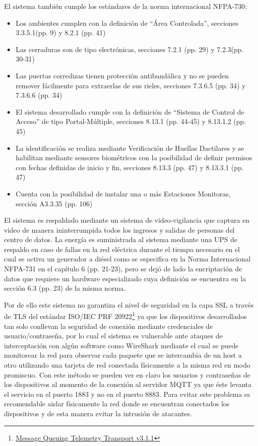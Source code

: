 \documentclass[../principal]{subfiles}
\begin{document}
  El sistema también cumple los estándares de la norma internacional NFPA-730\cite{norma:nfpa_730}:

  \begin{itemize}
    \item Los ambientes cumplen con la definición de ``Área Controlada'', secciones 3.3.5.1(pp. 9) y 8.2.1 (pp. 41)
    \item Las cerraduras son de tipo electrónicas, secciones 7.2.1 (pp. 29) y 7.2.3(pp. 30-31)
    \item Las puertas corredizas tienen protección antibandálica y no se pueden remover fácilmente para extraerlas de sus rieles, secciones 7.3.6.5 (pp. 34) y 7.3.6.6 (pp. 34)
    \item El sistema desarrollado cumple con la definición de ``Sistema de Control de Acceso'' de tipo Portal-Múltiple, secciones 8.13.1 (pp. 44-45) y 8.13.1.2 (pp. 45)
    \item La identificación se realiza mediante Verificación de Huellas Dactilares y se habilitan mediante sensores biométricos con la posibilidad de definir permisos con fechas definidas de inicio y fin, secciones 8.13.3 (pp. 47) y 8.13.3.1 (pp. 47)
    \item Cuenta con la posibilidad de instalar una o más Estaciones Monitoras, sección A3.3.35 (pp. 106)
  \end{itemize}


  El sistema es respaldado mediante un sistema de video-vigilancia que captura en video de manera ininterrumpida todos los ingresos y salidas de personas del centro de datos. La energía es suministrada al sistema mediante una UPS de respaldo en caso de fallas en la red eléctrica durante el tiempo necesario en el cual se activa un generador a diésel como se especifica en la Norma Internacional NFPA-731 en el capítulo 6 (pp. 21-23), pero se dejó de lado la encriptación de datos que requiere un hardware especializado cuya definición se encuentra en la sección 6.3 (pp. 23) de la misma norma. \cite{norma:nfpa_731}

  Por de ello este sistema no garantiza el nivel de seguridad en la capa SSL a través de TLS del estándar ISO/IEC PRF 20922\footnote{\href{https://www.iso.org/standard/69466.html}{Message Queuing Telemetry Transport v3.1.1}} ya que los dispositivos desarrollados tan solo conllevan la seguridad de conexión mediante credenciales de usuario/contraseña, por lo cual el sistema es vulnerable ante ataques de interceptación con algún software como WireShark mediante el cual se puede monitorear la red para observar cada paquete que se intercambia de un host a otro utilizando una tarjeta de red conectada físicamente a la misma red en modo promiscuo. Con este método se pueden ver en claro los usuarios y contraseñas de los dispositivos al momento de la conexión al servidor MQTT ya que éste levanta el servicio en el puerto 1883 y no en el puerto 8883. Para evitar este problema es recomendable aislar físicamente la red donde se encuentran conectados los dispositivos y de esta manera evitar la intrusión de atacantes.
\end{document}
